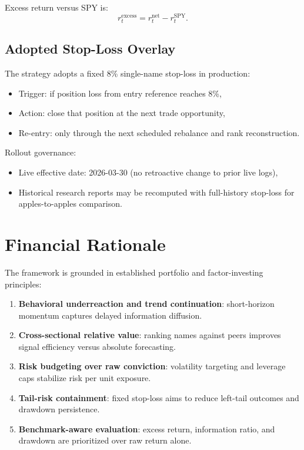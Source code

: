 \documentclass[11pt]{article}
\begin{document}
Excess return versus SPY is:
\begin{equation}
r_t^{\text{excess}}=r_t^{\text{net}}-r_t^{\text{SPY}}.
\end{equation}

\subsection{Adopted Stop-Loss Overlay}
The strategy adopts a fixed 8\% single-name stop-loss in production:
\begin{itemize}[leftmargin=1.5em]
    \item Trigger: if position loss from entry reference reaches 8\%,
    \item Action: close that position at the next trade opportunity,
    \item Re-entry: only through the next scheduled rebalance and rank reconstruction.
\end{itemize}

Rollout governance:
\begin{itemize}[leftmargin=1.5em]
    \item Live effective date: 2026-03-30 (no retroactive change to prior live logs),
    \item Historical research reports may be recomputed with full-history stop-loss for apples-to-apples comparison.
\end{itemize}

\section{Financial Rationale}
The framework is grounded in established portfolio and factor-investing principles:
\begin{enumerate}[leftmargin=1.5em]
    \item \textbf{Behavioral underreaction and trend continuation}: short-horizon momentum captures delayed information diffusion.
    \item \textbf{Cross-sectional relative value}: ranking names against peers improves signal efficiency versus absolute forecasting.
    \item \textbf{Risk budgeting over raw conviction}: volatility targeting and leverage caps stabilize risk per unit exposure.
    \item \textbf{Tail-risk containment}: fixed stop-loss aims to reduce left-tail outcomes and drawdown persistence.
    \item \textbf{Benchmark-aware evaluation}: excess return, information ratio, and drawdown are prioritized over raw return alone.
\end{enumerate}
\end{document}
